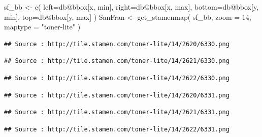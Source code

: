 \documentclass[
]{book}
\newenvironment{Shaded}{\begin{snugshade}}{\end{snugshade}}
\newcommand{\AttributeTok}[1]{\textcolor[rgb]{0.77,0.63,0.00}{#1}}
\newcommand{\DecValTok}[1]{\textcolor[rgb]{0.00,0.00,0.81}{#1}}
\newcommand{\FunctionTok}[1]{\textcolor[rgb]{0.00,0.00,0.00}{#1}}
\newcommand{\NormalTok}[1]{#1}
\newcommand{\OtherTok}[1]{\textcolor[rgb]{0.56,0.35,0.01}{#1}}
\newcommand{\SpecialCharTok}[1]{\textcolor[rgb]{0.00,0.00,0.00}{#1}}
\newcommand{\StringTok}[1]{\textcolor[rgb]{0.31,0.60,0.02}{#1}}
\begin{document}
\begin{Shaded}
\begin{Highlighting}[]
\NormalTok{sf\_bb }\OtherTok{\textless{}{-}} \FunctionTok{c}\NormalTok{(}
  \AttributeTok{left=}\NormalTok{db}\SpecialCharTok{@}\NormalTok{bbox[}\StringTok{\textquotesingle{}x\textquotesingle{}}\NormalTok{, }\StringTok{\textquotesingle{}min\textquotesingle{}}\NormalTok{],}
  \AttributeTok{right=}\NormalTok{db}\SpecialCharTok{@}\NormalTok{bbox[}\StringTok{\textquotesingle{}x\textquotesingle{}}\NormalTok{, }\StringTok{\textquotesingle{}max\textquotesingle{}}\NormalTok{],}
  \AttributeTok{bottom=}\NormalTok{db}\SpecialCharTok{@}\NormalTok{bbox[}\StringTok{\textquotesingle{}y\textquotesingle{}}\NormalTok{, }\StringTok{\textquotesingle{}min\textquotesingle{}}\NormalTok{],}
  \AttributeTok{top=}\NormalTok{db}\SpecialCharTok{@}\NormalTok{bbox[}\StringTok{\textquotesingle{}y\textquotesingle{}}\NormalTok{, }\StringTok{\textquotesingle{}max\textquotesingle{}}\NormalTok{]}
\NormalTok{  )}
\NormalTok{SanFran }\OtherTok{\textless{}{-}} \FunctionTok{get\_stamenmap}\NormalTok{(}
\NormalTok{  sf\_bb, }
  \AttributeTok{zoom =} \DecValTok{14}\NormalTok{, }
  \AttributeTok{maptype =} \StringTok{"toner{-}lite"}
\NormalTok{  )}
\end{Highlighting}
\end{Shaded}

\begin{verbatim}
## Source : http://tile.stamen.com/toner-lite/14/2620/6330.png
\end{verbatim}

\begin{verbatim}
## Source : http://tile.stamen.com/toner-lite/14/2621/6330.png
\end{verbatim}

\begin{verbatim}
## Source : http://tile.stamen.com/toner-lite/14/2622/6330.png
\end{verbatim}

\begin{verbatim}
## Source : http://tile.stamen.com/toner-lite/14/2620/6331.png
\end{verbatim}

\begin{verbatim}
## Source : http://tile.stamen.com/toner-lite/14/2621/6331.png
\end{verbatim}

\begin{verbatim}
## Source : http://tile.stamen.com/toner-lite/14/2622/6331.png
\end{verbatim}
\end{document}
